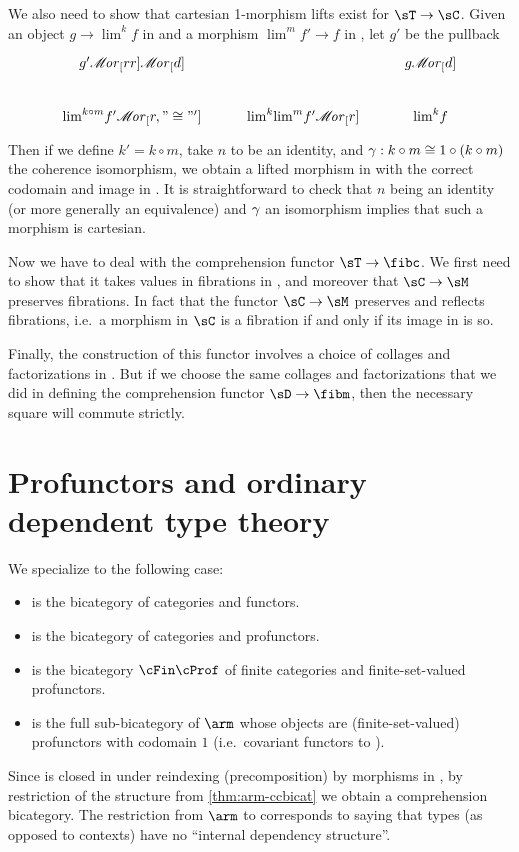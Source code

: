 \documentclass{amsart}
\def\ar#1{\mathscr{M}\!\mathit{or}_{#1}}
\let\mylim\lim
\def\lim{{\textstyle\mylim}}
\begin{document}
\begin{constr}
  We also need to show that cartesian 1-morphism lifts exist for $\sT\to\sC$.
  Given an object $g\to\lim^k f$ in \sT and a morphism $\lim^m f'\to f$ in \sC, let $g'$ be the pullback
  \[
  \begin{tikzcd}
    g' \ar[rr] \ar[d] && g\ar[d] \\
    \lim^{k\circ m} f' \ar[r,"\cong"'] & \lim^k\lim^m f' \ar[r] & \lim^k f
  \end{tikzcd}
  \]
  Then if we define $k'=k\circ m$, take $n$ to be an identity, and $\gamma:k\circ m \cong 1\circ (k\circ m)$ the coherence isomorphism, we obtain a lifted morphism in \sT with the correct codomain and image in \sC.
  It is straightforward to check that $n$ being an identity (or more generally an equivalence) and $\gamma$ an isomorphism implies that such a morphism is cartesian.

  Now we have to deal with the comprehension functor $\sT\to\fibc$.
  We first need to show that it takes values in fibrations in \sC, and moreover that $\sC\to\sM$ preserves fibrations.
  In fact  that the functor $\sC\to\sM$ preserves and reflects fibrations, i.e.\ a morphism in $\sC$ is a fibration if and only if its image in \sM is so.
  
  Finally, the construction of this functor involves a choice of collages and factorizations in \mh.
  But if we choose the same collages and factorizations that we did in defining the comprehension functor $\sD\to\fibm$, then the necessary square will commute strictly.
\end{constr}


\section{Profunctors and ordinary dependent type theory}
\label{sec:prof}

We specialize to the following case:
\begin{itemize}
\item \sK is the bicategory \cCat of categories and functors.
\item \mh is the bicategory \cProf of categories and profunctors.
\item \sM is the bicategory $\cFin\cProf$ of finite categories and finite-set-valued profunctors.
\item \sD is the full sub-bicategory of $\arm$ whose objects are (finite-set-valued) profunctors with codomain $1$ (i.e.\ covariant functors to \nFinSet).
\end{itemize}
Since \sD is closed in \arm under reindexing (precomposition) by morphisms in \sM, by restriction of the structure from \cref{thm:arm-ccbicat} we obtain a comprehension bicategory.
The restriction from $\arm$ to \sD corresponds to saying that types (as opposed to contexts) have no ``internal dependency structure''.
\end{document}
